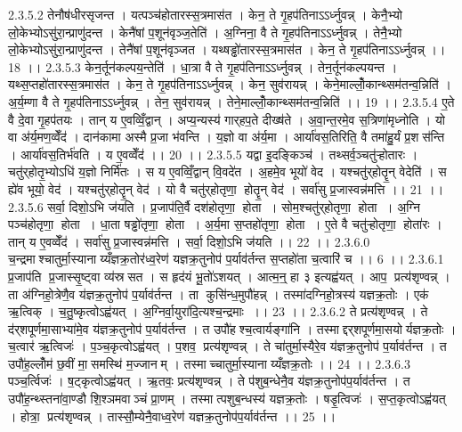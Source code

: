 2.3.5.2
तेनौष॑धीरसृजन्त । यत्पञ्च॑होतारस्स॒त्रमास॑त । केन॒ ते गृ॒हप॑तिनाऽऽर्ध्नुवन्न् । केनै॒भ्यो लो॒केभ्योऽसु॑रा॒न्प्राणु॑दन्त । केनै॑षां प॒शून॑वृञ्ज॒तेति॑ । अ॒ग्निना॒ वै ते गृ॒हप॑तिनाऽऽर्ध्नुवन्न् । तेनै॒भ्यो लो॒केभ्योऽसु॑रा॒न्प्राणु॑दन्त । तेनै॑षां प॒शून॑वृञ्जत । यथ्षड्ढो॑तारस्स॒त्रमास॑त । केन॒ ते गृ॒हप॑तिनाऽऽर्ध्नुवन्न् ।। 18 ।।
2.3.5.3
केन॒र्तून॑कल्पय॒न्तेति॑ । धा॒त्रा वै ते गृ॒हप॑तिनाऽऽर्ध्नुवन्न् । तेन॒र्तून॑कल्पयन्त । यथ्स॒प्तहो॑तारस्स॒त्रमास॑त । केन॒ ते गृ॒हप॑तिनाऽऽर्ध्नुवन्न् । केन॒ सुव॑रायन्न् । केने॒माल्लोँ॒कान्थ्सम॑तन्व॒न्निति॑ । अ॒र्य॒म्णा वै ते गृ॒हप॑तिनाऽऽर्ध्नुवन्न् । तेन॒ सुव॑रायन्न् । तेने॒माल्लोँ॒कान्थ्सम॑तन्व॒न्निति॑ ।। 19 ।।
2.3.5.4
ए॒ते वै दे॒वा गृ॒हप॑तयः । तान् य ए॒वव्विँ॒द्वान् । अप्य॒न्यस्य॑ गार्‌हप॒ते दीख्ष॑ते । अ॒वा॒न्त॒रमे॒व स॒त्रिणा॑मृध्नोति । यो वा अ॑र्य॒मण॒व्वेँद॑ । दान॑कामा अस्मै प्र॒जा भ॑वन्ति । य॒ज्ञो वा अ॑र्य॒मा । आर्या॑वस॒तिरिति॒ वै तमा॑हु॒र्यं प्र॒शस॑न्ति । आर्या॑वस॒तिर्भ॑वति । य ए॒वव्वेँद॑ ।। 20 ।।
2.3.5.5
यद्वा इ॒दङ्किञ्च॑ । तथ्सर्व॒ञ्चतु॑ऱ्होतारः । चतु॑र्‌होतृ॒भ्योऽधि॑ य॒ज्ञो निर्मि॑तः । स य ए॒वव्विँ॒द्वान्‌ वि॒वदे॑त । अ॒हमे॒व भूयो॑ वेद । यश्चतु॑र्‌होतॄ॒न् वेदेति॑ । स ह्ये॑व भूयो॒ वेद॑ । यश्चतु॑र्‌होतॄ॒न् वेद॑ । यो वै चतु॑र्‌होतृणा॒॒ होतॄ॒न् वेद॑ । सर्वा॑सु प्र॒जास्वन्न॑मत्ति ।। 21 ।।
2.3.5.6
सर्वा॒ दिशो॒ऽभि ज॑यति । प्र॒जाप॑ति॒र्वै दश॑होतृणा॒॒ होता । सोम॒श्चतु॑र्‌होतृणा॒॒ होता । अ॒ग्नि पञ्च॑होतृणा॒॒ होता । धा॒ता षड्ढो॑तृणा॒॒ होता । अ॒र्य॒मा स॒प्तहो॑तृणा॒॒ होता । ए॒ते वै चतु॑ऱ्होतृणा॒॒ होता॑रः । तान् य ए॒वव्वेँद॑ । सर्वा॑सु प्र॒जास्वन्न॑मत्ति । सर्वा॒ दिशो॒ऽभि ज॑यति ।। 22 ।।
2.3.6.0
च॒न्द्रमाश्चातुर्मा॒स्यानाय्यँज्ञक्र॒तोर॑ध्व॒रेण॑ यज्ञक्र॒तुनोप॑ प॒र्याव॑र्तन्त स॒प्तहो॑ता च॒त्वारि॑ च ।। 6 ।।
2.3.6.1
प्र॒जाप॑ति प्र॒जास्सृ॒ष्ट्वा व्य॑स्रसत । स हृद॑यं भू॒तो॑ऽशयत् । आत्म॒न्॒ हा ३ इत्यह्व॑यत् । आप॒ प्रत्य॑शृण्वन्न् । ता अ॑ग्निहो॒त्रेणै॒व य॑ज्ञक्र॒तुनोप॑ प॒र्याव॑र्तन्त । ता कुसि॑न्ध॒मुपौ॑हन्न् । तस्मा॑दग्निहो॒त्रस्य॑ यज्ञक्र॒तोः । एक॑ ऋ॒त्विक् । च॒तु॒ष्कृत्वोऽह्व॑यत् । अ॒ग्निर्वा॒युरा॑दि॒त्यश्च॒न्द्रमाः ।। 23 ।।
2.3.6.2
ते प्रत्य॑शृण्वन्न् । ते द॑र्‌शपूर्णमा॒साभ्या॑मे॒व य॑ज्ञक्र॒तुनोप॑ प॒र्याव॑र्तन्त । त उपौ॑हश्च॒त्वार्यङ्गा॑नि । तस्माद्दर्‌शपूर्णमा॒सयोर्यज्ञक्र॒तोः । च॒त्वार॑ ऋ॒त्विजः॑ । प॒ञ्च॒कृत्वोऽह्व॑यत् । प॒शव॒ प्रत्य॑शृण्वन्न् । ते चा॑तुर्मा॒स्यैरे॒व य॑ज्ञक्र॒तुनोप॑ प॒र्याव॑र्तन्त । त उपौ॑ह॒ल्लोँम॑ छ॒वीं मा॒॒समस्थि॑ म॒ज्जानम् । तस्माच्चातुर्मा॒स्यानाय्यँज्ञक्र॒तोः ।। 24 ।।
2.3.6.3
पञ्च॒र्त्विजः॑ । ष॒ट्कृत्वोऽह्व॑यत् । ऋ॒तवः॒ प्रत्य॑शृण्वन्न् । ते प॑शुब॒न्धेनै॒व य॑ज्ञक्र॒तुनोप॑प॒र्याव॑र्तन्त । त उपौ॑ह॒न्थ्स्तना॑वा॒ण्डौ शि॒श्ञमवाञ्चं प्रा॒णम् । तस्मात्पशुब॒न्धस्य॑ यज्ञक्र॒तोः । षडृ॒त्विजः॑ । स॒प्त॒कृत्वोऽह्व॑यत् । होत्रा॒ प्रत्य॑शृण्वन्न् । तास्सौ॒म्येनै॒वाध्व॒रेण॑ यज्ञक्र॒तुनोप॑प॒र्याव॑र्तन्त ।। 25 ।।

